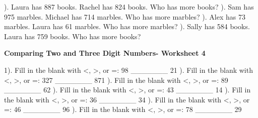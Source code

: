 \documentclass{article}%
\begin{document}
\newline%
). Laura has 887 books. Rachel has 824 books. Who has more books?%
\newline%
\newline%
). Sam has 975 marbles. Michael has 714 marbles. Who has more marbles?%
\newline%
\newline%
). Alex has 73 marbles. Laura has 61 marbles. Who has more marbles?%
\newline%
\newline%
). Sally has 584 books. Laura has 759 books. Who has more books?%
\newline%
\newline%
\newline%
\pagebreak%
\large%
\begin{center}%
\textbf{Comparing Two and Three Digit Numbers- Worksheet 4}%
\newline%
\end{center} \normalsize%
1). Fill in the blank with <, >, or =: 98 \_\_\_\_\_\_\_ 21%
\newline%
\newline%
). Fill in the blank with <, >, or =: 327 \_\_\_\_\_\_\_ 871%
\newline%
\newline%
). Fill in the blank with <, >, or =: 89 \_\_\_\_\_\_\_ 62%
\newline%
\newline%
). Fill in the blank with <, >, or =: 43 \_\_\_\_\_\_\_ 14%
\newline%
\newline%
). Fill in the blank with <, >, or =: 36 \_\_\_\_\_\_\_ 34%
\newline%
\newline%
). Fill in the blank with <, >, or =: 46 \_\_\_\_\_\_\_ 96%
\newline%
\newline%
). Fill in the blank with <, >, or =: 78 \_\_\_\_\_\_\_ 29%
\newline%
\end{document}
